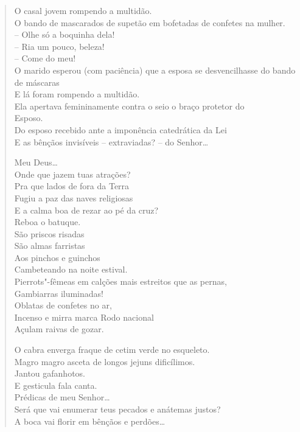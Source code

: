 \begin{verse}
O casal jovem rompendo a multidão.\\
O bando de mascarados de supetão em bofetadas de confetes na mulher.\\
-- Olhe só a boquinha dela!\\
-- Ria um pouco, beleza!\\
-- Come do meu!\\
O marido esperou (com paciência) que a esposa se desvencilhasse do bando de máscaras\\
E lá foram rompendo a multidão.\\
Ela apertava femininamente contra o seio o braço protetor do\\
Esposo.\\
Do esposo recebido ante a imponência catedrática da Lei\\
E as bênçãos invisíveis -- extraviadas? -- do Senhor\ldots{}

Meu Deus\ldots{}\\
Onde que jazem tuas atrações?\\
Pra que lados de fora da Terra\\
Fugiu a paz das naves religiosas\\
E a calma boa de rezar ao pé da cruz?\\
Reboa o batuque.\\
São priscos risadas\\
São almas farristas\\
Aos pinchos e guinchos\\
Cambeteando na noite estival.\\
Pierrots"-fêmeas em calções mais estreitos que as pernas,\\
\quad{}Gambiarras iluminadas!\\
Oblatas de confetes no ar,\\
Incenso e mirra marca Rodo nacional\\
Açulam raivas de gozar.

O cabra enverga fraque de cetim verde no esqueleto.\\
Magro magro asceta de longos jejuns dificílimos.\\
Jantou gafanhotos.\\
E gesticula fala canta.\\
Prédicas de meu Senhor\ldots{}\\
Será que vai enumerar teus pecados e anátemas justos?\\
A boca vai florir em bênçãos e perdões\ldots{}


\end{verse}
